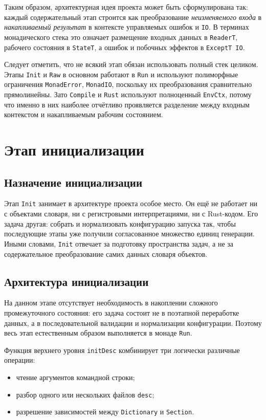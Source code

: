 \documentclass[a4paper,12pt]{article}
\begin{document}
Таким образом, архитектурная идея проекта может быть сформулирована так: каждый
содержательный этап строится как преобразование \textit{неизменяемого входа} в
\textit{накапливаемый результат} в контексте управляемых ошибок и \texttt{IO}. В терминах
монадического стека это означает размещение входных данных в \texttt{ReaderT}, рабочего
состояния в \texttt{StateT}, а ошибок и побочных эффектов в \texttt{ExceptT IO}.

Следует отметить, что не всякий этап обязан использовать полный стек целиком. Этапы
\texttt{Init} и \texttt{Raw} в основном работают в \texttt{Run} и используют
полиморфные ограничения \texttt{MonadError}, \texttt{MonadIO}, поскольку их
преобразования сравнительно прямолинейны. Зато \texttt{Compile} и \texttt{Rust}
используют полноценный \texttt{EnvCtx}, потому что именно в них наиболее отчётливо
проявляется разделение между входным контекстом и накапливаемым рабочим состоянием.

\pagebreak

\section{Этап инициализации}

\subsection{Назначение инициализации}

Этап \texttt{Init} занимает в архитектуре проекта особое место. Он ещё не работает ни
с объектами словаря, ни с регистровыми интерпретациями, ни с Rust-кодом. Его задача
другая: собрать и нормализовать конфигурацию запуска так, чтобы последующие этапы уже
получили согласованное множество единиц генерации. Иными словами, \texttt{Init} отвечает
за подготовку пространства задач, а не за содержательное преобразование самих данных
словаря объектов.

\subsection{Архитектура инициализации}

На данном этапе отсутствует необходимость в накоплении сложного промежуточного
состояния: его задача состоит не в поэтапной переработке данных, а в последовательной
валидации и нормализации конфигурации. Поэтому весь этап естественным образом
выполняется в монаде \texttt{Run}.

Функция верхнего уровня \texttt{initDesc} комбинирует три логически различные операции:
\begin{itemize}
  \item чтение аргументов командной строки;
  \item разбор одного или нескольких файлов \texttt{desc};
  \item разрешение зависимостей между \texttt{Dictionary} и \texttt{Section}.
\end{itemize}
\end{document}

